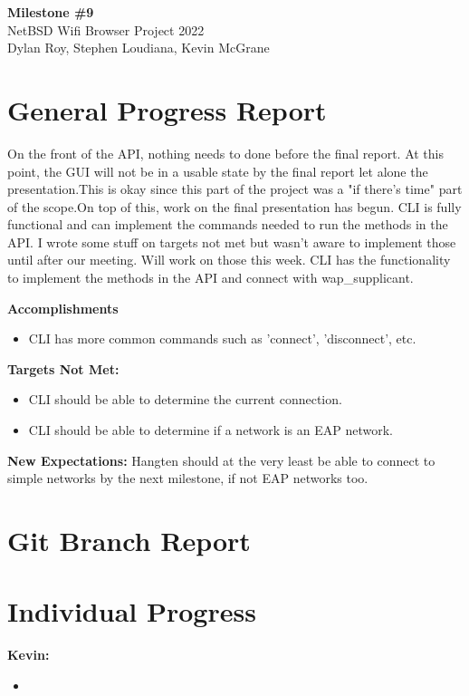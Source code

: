 \documentclass[11pt]{article}
\begin{document}
\begin{center}
  \textbf{\Large Milestone \#9}\\\large NetBSD Wifi Browser Project 2022\\
  Dylan Roy, Stephen Loudiana, Kevin McGrane
\end{center}

\section{General Progress Report}
On the front of the API, nothing needs to done before the final report.
At this point, the GUI will not be in a usable state by the final report
let alone the presentation.This is okay since this part of the project was 
a "if there's time" part of the scope.On top of this, work on the final 
presentation has begun. CLI is fully functional and can implement the 
commands needed to run the methods in the API. I wrote some stuff on 
targets not met but wasn't aware to implement those until after our 
meeting. Will work on those this week. CLI has the functionality to 
implement the methods in the API and connect with wap_supplicant. 

\textbf{Accomplishments}
\begin{itemize}
  \item CLI has more common commands such as 'connect', 'disconnect', etc. 
\end{itemize}

\textbf{Targets Not Met:}
\begin{itemize}
  \item CLI should be able to determine the current connection. 
  \item CLI should be able to determine if a network is an EAP network. 
\end{itemize}

\textbf{New Expectations:}
Hangten should at the very least be able to connect to simple networks by the
next milestone, if not EAP networks too.

\section{Git Branch Report}

\newpage
\section{Individual Progress}

\textbf{Kevin:}
\begin{itemize}
  \item
\end{itemize}
\end{document}
